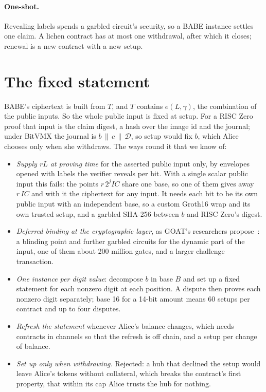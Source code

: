 \documentclass[11pt]{article}
\begin{document}
\paragraph{One-shot.} Revealing labels spends a garbled circuit's
security, so a BABE instance settles one claim. A lichen contract has at
most one withdrawal, after which it closes; renewal is a new contract
with a new setup.

\section{The fixed statement}
\label{sec:fixed}

BABE's ciphertext is built from $T$, and $T$ contains $e(L, \gamma)$,
the combination of the public inputs. So the whole public input is fixed
at setup. For a RISC Zero proof that input is the claim digest, a hash
over the image id and the journal; under BitVMX the journal is
$b \,\|\, c \,\|\, \mathcal{D}$, so setup would fix $b$, which Alice chooses only
when she withdraws. The ways round it that we know of:
\begin{itemize}[leftmargin=1.5em]
\item \emph{Supply $rL$ at proving time} for the asserted public input
  only, by envelopes opened with labels the verifier reveals per bit.
  With a single scalar public input this fails: the points
  $r\,2^j\mathit{IC}$ share one base, so one of them gives away
  $r\,\mathit{IC}$ and with it the ciphertext for any input. It needs
  each bit to be its own public input with an independent base, so a
  custom Groth16 wrap and its own trusted setup, and a garbled SHA-256
  between $b$ and RISC Zero's digest.
\item \emph{Deferred binding at the cryptographic layer}, as GOAT's
  researchers propose~\cite{goat}: a blinding point and further garbled
  circuits for the dynamic part of the input, one of them about 200
  million gates, and a larger challenge transaction.
\item \emph{One instance per digit value}: decompose $b$ in base $B$ and
  set up a fixed statement for each nonzero digit at each position. A
  dispute then proves each nonzero digit separately; base 16 for a
  14-bit amount means 60 setups per contract and up to four disputes.
\item \emph{Refresh the statement} whenever Alice's balance changes,
  which needs contracts in channels so that the refresh is off chain,
  and a setup per change of balance.
\item \emph{Set up only when withdrawing.} Rejected: a hub that declined
  the setup would leave Alice's tokens without collateral, which breaks
  the contract's first property, that within its cap Alice trusts the
  hub for nothing.
\end{itemize}
\end{document}
